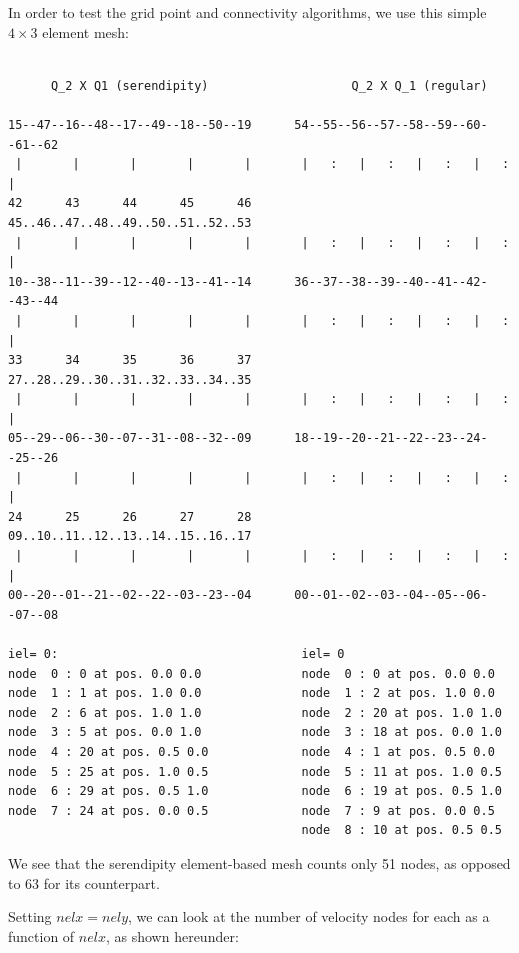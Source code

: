 In order to test the grid point and connectivity algorithms, 
we use this simple $4\times 3$ element mesh:

\begin{verbatim}

      Q_2 X Q1 (serendipity)                    Q_2 X Q_1 (regular)

15--47--16--48--17--49--18--50--19      54--55--56--57--58--59--60--61--62
 |       |       |       |       |       |   :   |   :   |   :   |   :   |
42      43      44      45      46      45..46..47..48..49..50..51..52..53
 |       |       |       |       |       |   :   |   :   |   :   |   :   |
10--38--11--39--12--40--13--41--14      36--37--38--39--40--41--42--43--44
 |       |       |       |       |       |   :   |   :   |   :   |   :   |
33      34      35      36      37      27..28..29..30..31..32..33..34..35
 |       |       |       |       |       |   :   |   :   |   :   |   :   |
05--29--06--30--07--31--08--32--09      18--19--20--21--22--23--24--25--26
 |       |       |       |       |       |   :   |   :   |   :   |   :   |
24      25      26      27      28      09..10..11..12..13..14..15..16..17
 |       |       |       |       |       |   :   |   :   |   :   |   :   |
00--20--01--21--02--22--03--23--04      00--01--02--03--04--05--06--07--08

iel= 0:                                  iel= 0
node  0 : 0 at pos. 0.0 0.0              node  0 : 0 at pos. 0.0 0.0
node  1 : 1 at pos. 1.0 0.0              node  1 : 2 at pos. 1.0 0.0
node  2 : 6 at pos. 1.0 1.0              node  2 : 20 at pos. 1.0 1.0
node  3 : 5 at pos. 0.0 1.0              node  3 : 18 at pos. 0.0 1.0
node  4 : 20 at pos. 0.5 0.0             node  4 : 1 at pos. 0.5 0.0
node  5 : 25 at pos. 1.0 0.5             node  5 : 11 at pos. 1.0 0.5
node  6 : 29 at pos. 0.5 1.0             node  6 : 19 at pos. 0.5 1.0
node  7 : 24 at pos. 0.0 0.5             node  7 : 9 at pos. 0.0 0.5
                                         node  8 : 10 at pos. 0.5 0.5
\end{verbatim}

We see that the serendipity element-based mesh counts only 51 nodes, as
opposed to 63 for its counterpart.

Setting $nelx=nely$, we can look at the number of velocity nodes for each 
as a function of $nelx$, as shown hereunder:

